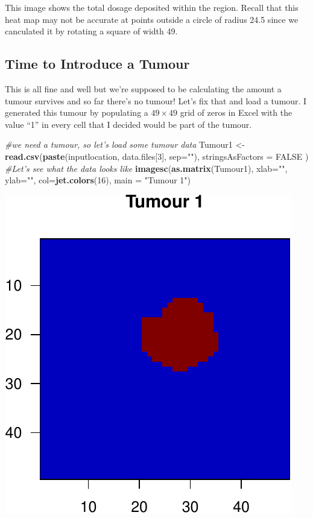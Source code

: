 \documentclass[]{article}
\newenvironment{Shaded}{\begin{snugshade}}{\end{snugshade}}
\newcommand{\KeywordTok}[1]{\textcolor[rgb]{0.13,0.29,0.53}{\textbf{#1}}}
\newcommand{\DataTypeTok}[1]{\textcolor[rgb]{0.13,0.29,0.53}{#1}}
\newcommand{\DecValTok}[1]{\textcolor[rgb]{0.00,0.00,0.81}{#1}}
\newcommand{\StringTok}[1]{\textcolor[rgb]{0.31,0.60,0.02}{#1}}
\newcommand{\CommentTok}[1]{\textcolor[rgb]{0.56,0.35,0.01}{\textit{#1}}}
\newcommand{\OtherTok}[1]{\textcolor[rgb]{0.56,0.35,0.01}{#1}}
\newcommand{\NormalTok}[1]{#1}
\begin{document}
This image shows the total dosage deposited within the region. Recall
that this heat map may not be accurate at points outside a circle of
radius 24.5 since we canculated it by rotating a square of width 49.

\subsection{Time to Introduce a
Tumour}\label{time-to-introduce-a-tumour}

This is all fine and well but we're supposed to be calculating the
amount a tumour survives and so far there's no tumour! Let's fix that
and load a tumour. I generated this tumour by populating a
\(49 \times 49\) grid of zeros in Excel with the value ``1'' in every
cell that I decided would be part of the tumour.

\begin{Shaded}
\begin{Highlighting}[]
\CommentTok{#we need a tumour, so let's load some tumour data}
\NormalTok{Tumour1 <-}\StringTok{ }\KeywordTok{read.csv}\NormalTok{(}\KeywordTok{paste}\NormalTok{(inputlocation, data.files[}\DecValTok{3}\NormalTok{], }\DataTypeTok{sep=}\StringTok{""}\NormalTok{), }\DataTypeTok{stringsAsFactors =} \OtherTok{FALSE}\NormalTok{ )}
\CommentTok{#Let's see what the data looks like}
\KeywordTok{imagesc}\NormalTok{(}\KeywordTok{as.matrix}\NormalTok{(Tumour1), }\DataTypeTok{xlab=}\StringTok{""}\NormalTok{, }\DataTypeTok{ylab=}\StringTok{""}\NormalTok{, }\DataTypeTok{col=}\KeywordTok{jet.colors}\NormalTok{(}\DecValTok{16}\NormalTok{), }\DataTypeTok{main =} \StringTok{"Tumour 1"}\NormalTok{)}
\end{Highlighting}
\end{Shaded}

\begin{center}\includegraphics{TumourSurvival_files/figure-latex/unnamed-chunk-5-1} \end{center}
\end{document}
